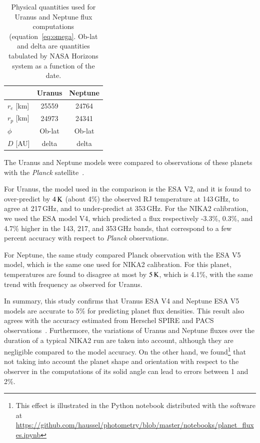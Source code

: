 \documentclass[traditionalabstract]{aa}
\begin{document}
{\begin{appendix}
\begin{table}[!ht]
\begin{center}
\begin{tabular}{lcc}
\hline\hline
\noalign{\smallskip}
     & Uranus & Neptune \\
\hline
\noalign{\smallskip}
$r_{e}$ [km]  & 25559 & 24764 \\ 
$r_{p}$ [km]  & 24973 & 24341  \\
$\phi$         & Ob-lat & Ob-lat \\
$D$   [AU]    & delta   & delta \\
\hline
\end{tabular}
\end{center}
\caption[Primary calibrator flux models]{Physical quantities used for Uranus and Neptune flux
  computations (equation~\ref{eq:omega}. Ob-lat and delta are quantities 
  tabulated by NASA Horizons system as a function of the date.}
\label{tab:planetphysparam}
\end{table}

The Uranus and Neptune models were compared to 
observations of these planets with the \emph{Planck}
satellite~\citep{PLCK-LII}.

For Uranus, the model used in the comparison
is the ESA V2, and it is found to over-predict by $4\,\rm{K}$ (about 4\%) the
observed RJ temperature at 143\,GHz, to agree at 217\,GHz, and
to under-predict at 353\,GHz. For the NIKA2 calibration, we used the ESA
model V4, which predicted a flux respectively -3.3\%, 0.3\%, and 4.7\% higher in the
143, 217, and 353\,GHz bands, that correspond to a few percent accuracy
with respect to \emph{Planck} observations.

For Neptune, the same study compared Planck observation with the ESA V5
model, which is the same one used for NIKA2 calibration. For this
planet, temperatures are found to disagree at most by $5\, \rm{K}$, which is 4.1\%,
with the same trend with frequency as observed for Uranus.

In summary, this study confirms that Uranus ESA V4 and Neptune ESA V5
models are accurate to 5\% for predicting planet flux densities. This
result also agrees with the accuracy estimated from Herschel SPIRE
and PACS observations~\citep{Mueller2016, Swinyard2014}. 
Furthermore, the variations of Uranus and Neptune fluxes over the duration of a typical
NIKA2 run are taken into account, although they are negligible
compared to the model accuracy. On the other hand, we
found\footnote{This effect is illustrated in the Python notebook
  distributed with the software at \url{https://github.com/haussel/photometry/blob/master/notebooks/planet_fluxes.ipynb}} that not
taking into account the planet shape and orientation with respect to
the observer in the computations of its solid angle can lead to errors
between 1 and 2\%.



\end{appendix}}
\end{document}
